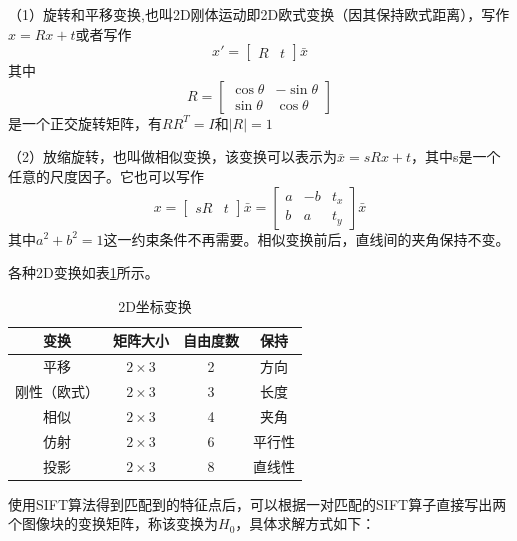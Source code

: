 （1）旋转和平移变换,也叫2D刚体运动即2D欧式变换（因其保持欧式距离），写作\(x={Rx+t}\)或者写作
\begin{equation}
	x' = 
	\begin{bmatrix}
	R & t	
	\end{bmatrix}
	\bar{x}
\end{equation}
其中
\begin{equation}
	R = 
	\begin{bmatrix}
	\cos{\theta} & -\sin{\theta} \\
	\sin{\theta} & \cos{\theta}
	\end{bmatrix}
\end{equation}
是一个正交旋转矩阵，有\(RR^T = I\)和\(|R| = 1\)

（2）放缩旋转，也叫做相似变换，该变换可以表示为\({\bar{x}}={sRx+t}\)，其中s是一个任意的尺度因子。它也可以写作
\begin{equation}
	x ={ 
	\begin{bmatrix}
	sR & t
	\end{bmatrix}
	\bar{x}
	}
	={
	\begin{bmatrix}
	a & -b & t_x \\
	b & a & t_y
	\end{bmatrix}
	\bar{x}
	}
\end{equation}
其中\(a^2 + b^2 = 1\)这一约束条件不再需要。相似变换前后，直线间的夹角保持不变。

各种2D变换如表\ref{2dtrans}所示。

\begin{table}[h]
\caption{2D坐标变换}
\label{2dtrans}
\centering
\begin{tabular}{|c|c|c|c|}
\hline
\textbf{变换} & \textbf{矩阵大小} & \textbf{自由度数} & \textbf{保持} \\ \hline
平移          &   \(2\times{3}\)	& 2             & 方向          \\ \hline
刚性（欧式）    &   \(2\times{3}\) & 3             & 长度          \\ \hline
相似          &   \(2\times{3}\)  & 4             & 夹角          \\ \hline
仿射          &   \(2\times{3}\)  & 6             & 平行性         \\ \hline
投影          &   \(2\times{3}\)   & 8             & 直线性         \\ \hline
\end{tabular}
\end{table}


使用SIFT算法得到匹配到的特征点后，可以根据一对匹配的SIFT算子直接写出两个图像块的变换矩阵，称该变换为\(H_0\)，具体求解方式如下：

